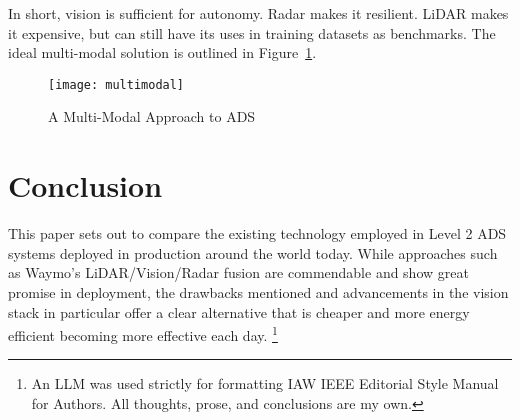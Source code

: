 \documentclass[12pt]{article}
\begin{document}
In short, vision is sufficient for autonomy. Radar makes it resilient. LiDAR
makes it expensive, but can still have its uses in training datasets as
benchmarks. The ideal multi-modal solution is outlined in
Figure~\ref{fig:multimodal}.
\begin{figure}[H]
	\centering
	\texttt{[image: multimodal]}
	\caption{A Multi-Modal Approach to ADS \autocite{Hasanujjaman2023}}
	\label{fig:multimodal}
\end{figure}
\section{Conclusion}

This paper sets out to compare the existing technology employed in Level 2 ADS systems
deployed in production around the world today. While approaches such as Waymo's
LiDAR/Vision/Radar fusion are commendable and show great promise in deployment, the
drawbacks mentioned and advancements in the vision stack in particular offer a
clear alternative that is cheaper and more energy efficient becoming more effective each day.
\footnote{An LLM was used strictly for formatting IAW IEEE Editorial Style Manual
	for Authors. All thoughts, prose, and conclusions are
my own.}
\newpage
{}
\printbibliography
\end{document}
